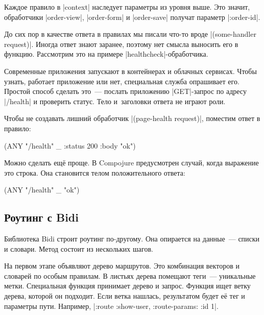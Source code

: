 Каждое правило в \spverb|context| наследует параметры из уровня выше. Это
значит, обработчики \spverb|order-view|, \spverb|order-form| и
\spverb|order-save| получат параметр \spverb|:order-id|.

До сих пор в качестве ответа в правилах мы писали что-то вроде
\spverb|(some-handler request)|. Иногда ответ знают заранее, поэтому нет смысла
выносить его в функцию. Рассмотрим это на примере
\spverb|healthcheck|-обработчика.

Современные приложения запускают в контейнерах и облачных сервисах. Чтобы
узнать, работает приложение или нет, специальная служба опрашивает его. Простой
способ сделать это~--- послать приложению \spverb|GET|-запрос по адресу
\spverb|/health| и проверить статус. Тело и~заголовки ответа не играют роли.

Чтобы не создавать лишний обработчик \spverb|(page-health request)|, поместим
ответ в правило:

\begin{english}
  \begin{clojure}
(ANY "/health" _ {:status 200 :body "ok"})
  \end{clojure}
\end{english}

Можно сделать ещ\"{е} проще. В Compojure предусмотрен случай, когда выражение это
строка. Она становится телом положительного ответа:

\begin{english}
  \begin{clojure}
(ANY "/health" _ "ok")
  \end{clojure}
\end{english}

\subsection{Роутинг с Bidi}

Библиотека Bidi строит роутинг
по-другому. Она опирается на данные~--- списки и словари. Метод состоит из
нескольких шагов.

На первом этапе объявляют дерево маршрутов. Это комбинация векторов и словарей
по особым правилам. В листьях дерева помещают теги~--- уникальные
метки. Специальная функция принимает дерево и запрос. Функция ищет ветку дерева,
которой он подходит. Если ветка нашлась, результатом будет е\"{е} тег и параметры
пути. Например, \spverb|{:route :show-user, :route-params: {:id 1}}|.

